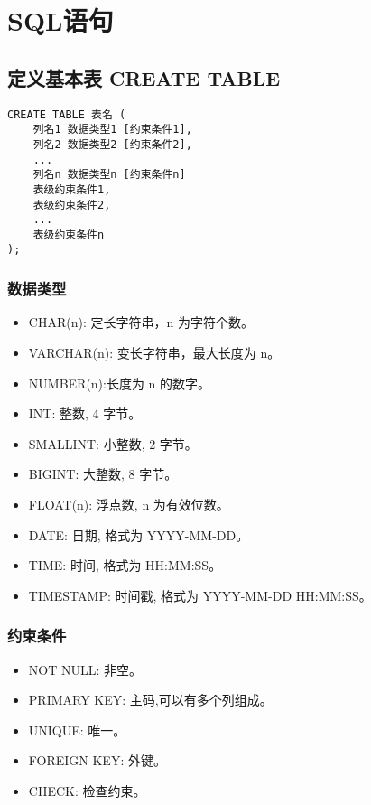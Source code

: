 \section{SQL语句}
\subsection{定义基本表 CREATE TABLE}
\begin{lstlisting}
CREATE TABLE 表名 (
    列名1 数据类型1 [约束条件1],
    列名2 数据类型2 [约束条件2],
    ...
    列名n 数据类型n [约束条件n]
    表级约束条件1,
    表级约束条件2,
    ...
    表级约束条件n
);
\end{lstlisting}
\subsubsection{数据类型}
\begin{itemize}
    \item CHAR(n): 定长字符串，n 为字符个数。
    \item VARCHAR(n): 变长字符串，最大长度为 n。
    \item NUMBER(n):长度为 n 的数字。
    \item INT: 整数, 4 字节。
    \item SMALLINT: 小整数, 2 字节。
    \item BIGINT: 大整数, 8 字节。
    \item FLOAT(n): 浮点数, n 为有效位数。
    \item DATE: 日期, 格式为 YYYY-MM-DD。
    \item TIME: 时间, 格式为 HH:MM:SS。
    \item TIMESTAMP: 时间戳, 格式为 YYYY-MM-DD HH:MM:SS。
\end{itemize}
\subsubsection{约束条件}
\begin{itemize}
    \item NOT NULL: 非空。
    \item PRIMARY KEY: 主码,可以有多个列组成。
    \item UNIQUE: 唯一。
    \item FOREIGN KEY: 外键。
    \item CHECK: 检查约束。
\end{itemize}
